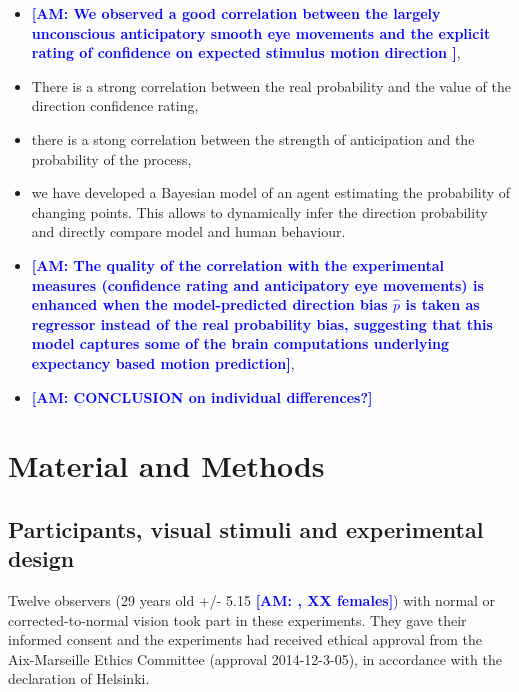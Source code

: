 \documentclass[12pt,english]{article}%
\newcommand{\AM}[1]{\textbf{\textcolor{blue}{[AM: #1]}}}
\begin{document}
\begin{itemize}\setlength{\itemsep}{0ex}
\item \AM{ We observed a good correlation between the largely unconscious anticipatory smooth eye movements and the explicit rating of confidence on expected stimulus motion direction },
\item There is a strong correlation between the real probability and the value of the direction confidence rating,

\item there is a stong correlation between the strength of anticipation and the probability of the process,

\item we have developed a Bayesian model of an agent estimating the probability of changing points. This allows to dynamically infer the direction probability and directly compare model and human behaviour.
\item \AM{ The quality of the correlation with the experimental measures (confidence rating and anticipatory eye movements) is enhanced when the model-predicted direction bias $\hat{p}$ is taken as regressor instead of the real probability bias, suggesting that this model captures some of the brain computations underlying expectancy based motion prediction},
\item \AM{CONCLUSION on individual differences?}


%

\end{itemize}
\section{Material and Methods}
\subsection{Participants, visual stimuli and experimental design}
Twelve observers (29 years old +/- 5.15 \AM{, XX females}) with normal or corrected-to-normal vision took part in these experiments. They gave their informed consent and the experiments had received ethical approval from the Aix-Marseille Ethics Committee (approval 2014-12-3-05), in accordance with the declaration of Helsinki.
\end{document}
